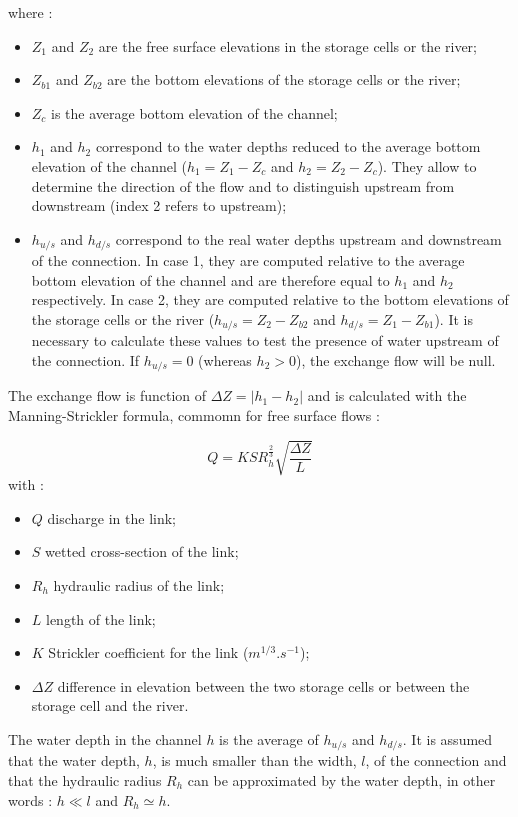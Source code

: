 where :
\begin{itemize}
 \item $Z_1$ and $Z_2$ are the free surface elevations in the storage cells or the river;
 \item $Z_{b1}$ and $Z_{b2}$ are the bottom elevations of the storage cells or the river;
 \item $Z_c$ is the average bottom elevation of the channel;
 \item $h_1$ and $h_2$ correspond to the water depths reduced to the average bottom elevation of the channel ($h_1 = Z_1 - Z_c$ and $h_2 = Z_2 - Z_c$). They allow to determine the direction of the flow and to distinguish upstream from downstream (index 2 refers to upstream);
 \item $h_{u/s}$ and $h_{d/s}$ correspond to the real water depths upstream and downstream of the connection. In case 1, they are computed relative to the average bottom elevation of the channel and are therefore equal to $h_1$ and $h_2$ respectively. In case 2, they are computed relative to the bottom elevations of the storage cells or the river ($h_{u/s} = Z_2 - Z_{b2}$ and $h_{d/s} = Z_1 - Z_{b1}$). It is necessary to calculate these values to test the presence of water upstream of the connection. If $h_{u/s} = 0$ (whereas $h_2 > 0$), the exchange flow will be null.
\end{itemize}

The exchange flow is function of $\Delta Z = |h_1 - h_2|$ and is calculated with the Manning-Strickler formula, commomn for free surface flows :

\begin{equation}
 Q = K S R_{h}^{\frac{2}{3}} \sqrt{\frac{\Delta Z}{L}}
\end{equation}
with :
\begin{itemize}
 \item $Q$ discharge in the link;
 \item $S$ wetted cross-section of the link;
 \item $R_h$ hydraulic radius of the link;
 \item $L$ length of the link;
 \item $K$ Strickler coefficient for the link ($m^{1/3}.s^{-1}$);
 \item $\Delta Z$ difference in elevation between the two storage cells or between the storage cell and the river.
\end{itemize}

The water depth in the channel $h$ is the average of $h_{u/s}$ and $h_{d/s}$. It is assumed that the water depth, $h$, is much smaller than the width, $l$, of the connection and that the hydraulic radius $R_h$ can be approximated by the water depth, in other words : $h \ll l$ and $R_h \simeq h$.

